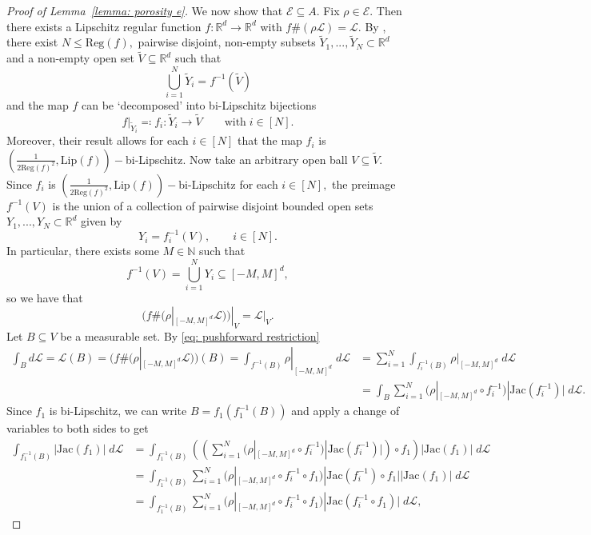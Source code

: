 \documentclass{article}
\newcommand{\R}{\mathbb{R}}
\newcommand{\N}{\mathbb{N}}
\newcommand{\leb}{\mc{L}}
\newcommand{\mc}[1]{\mathcal{#1}}
\begin{document}
\begin{proof}[Proof of Lemma~\ref{lemma: porosity e}]
 We now show that $\mathcal{E} \subseteq A$. Fix $\rho \in \mathcal{E}.$ Then there exists a Lipschitz regular function $f:\R^d \to \R^d$ with $f\#(\rho\leb) = \leb$. 
 By \cite[Proposition~$2.15$]{dymond2018mapping}, there exist 
 $N \leq \text{Reg}(f),$ pairwise disjoint, non-empty subsets $\widetilde{Y}_1,...,\widetilde{Y}_{N} \subset \R^d$ and a non-empty open set $\widetilde{V} \subseteq \R^d$ such that $$\bigcup_{i=1}^{N} \widetilde{Y}_i = f^{-1}(\widetilde{V})$$ and
 the map $f$ can be `decomposed' into bi-Lipschitz bijections  $$f|_{\widetilde{Y}_i} \eqqcolon f_i:\widetilde{Y}_i \to \widetilde{V}\qquad \text{with} \;i \in [N].$$ Moreover, their result allows for each $i \in [N]$ that the map $f_i$ is $( \frac{1}{2\text{Reg}(f)^2},\text{Lip}(f))-$bi-Lipschitz. Now take an arbitrary open ball $V \subseteq \widetilde{V}$. Since $f_i$ is $( \frac{1}{2\text{Reg}(f)^2},\text{Lip}(f))-$bi-Lipschitz for each $i \in [N],$ the preimage $f^{-1}(V)$ is the union of a collection of pairwise disjoint bounded open sets $Y_1,...,Y_{N} \subset \R^d$ given by
 $$Y_i = f_i^{-1}(V),\qquad i \in [N].$$ 
In particular, there exists some $M \in \N$ such that
$$f^{-1}(V) = \bigcup_{i=1}^NY_i \subseteq [-M,M]^d,$$ so we have that
  \begin{equation} \label{eq: pushforward restriction}
     (f\#(\rho|_{[-M,M]^d}\leb))|_{V} = \leb|_{V}.
 \end{equation} 
Let $B\subseteq V$ be a measurable set. By \eqref{eq: pushforward restriction}
\begin{equation*}
\begin{split}
    \int_{B}d\leb =\leb(B) = (f\#(\rho|_{[-M,M]^d}\leb))(B) = \int_{f^{-1}(B)} \rho|_{[-M,M]^d}\; d\leb &= \sum_{i=1}^N \int_{f_i^{-1}(B)}\rho|_{[-M,M]^d} \; d\leb \\&=\int_{B}\sum_{i=1}^N(\rho|_{[-M,M]^d}\circ f_i^{-1}) |\text{Jac}(f_i^{-1})| \; d\leb. 
    \end{split}
\end{equation*}
Since $f_1$ is bi-Lipschitz, we can write $B = f_1(f_1^{-1}(B))$ and apply a change of variables to both sides to get
\begin{equation*}
\begin{split}
    \int_{f_1^{-1}(B)}|\text{Jac}(f_1)|\;d\leb &=  \int_{f_1^{-1}(B)}\left(\left(\sum_{i=1}^N(\rho|_{[-M,M]^d}\circ f_i^{-1}) |\text{Jac}(f_i^{-1})|\right)\circ f_1\right)|\text{Jac}(f_1)| \; d\leb \\&= \int_{f_1^{-1}(B)}\sum_{i=1}^N(\rho|_{[-M,M]^d}\circ f_i^{-1}\circ f_1) |\text{Jac}(f_i^{-1})\circ f_1||\text{Jac}(f_1)| \; d\leb \\&= \int_{f_1^{-1}(B)}\sum_{i=1}^N(\rho|_{[-M,M]^d}\circ f_i^{-1}\circ f_1) |\text{Jac}(f_i^{-1}\circ f_1)| \; d\leb,

\end{split}
\end{equation*}
\end{proof}
\end{document}
